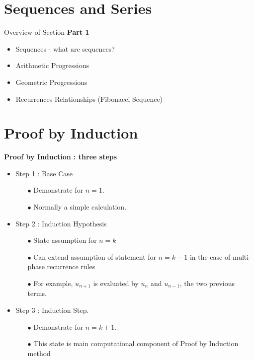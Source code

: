 \documentclass{beamer}
\begin{document}


\section{Sequences and Series}


\begin{frame}{Overview of Section}
\Large
\textbf{Part 1}
  \begin{itemize}
  \item Sequences - what are sequences?

  \item Arithmetic Progressions

  \item Geometric Progressions
   
  \item Recurrences Relationships (Fibonacci Sequence)
 
   \end{itemize}
\end{frame}

\section{Proof by Induction}
\begin{frame}
\Large
\textbf{Proof by Induction :  three steps}
\begin{itemize}
\item Step 1 : Base Case
\begin{itemize}
\item[$\bullet$]  Demonstrate for $n=1$.
\item[$\bullet$]  Normally a simple calculation.
\end{itemize}
\item Step 2 : Induction Hypothesis 

\begin{itemize}
\item[$\bullet$] State assumption for $n=k$
\item[$\bullet$]  Can extend assumption of statement for $n=k-1$ in the case of multi-phase recurrence rules 
\item[$\bullet$] For example, $u_{n+1}$ is evaluated by $u_{n}$ and $u_{n-1}$, the two previous terms.
\end{itemize}

\item Step 3 : Induction Step.
\begin{itemize}
\item[$\bullet$]  Demonstrate for $n=k+1$.
\item[$\bullet$] 
This state is main computational component of Proof by Induction method
\end{itemize}
\end{itemize}

\end{frame}
\end{document}
